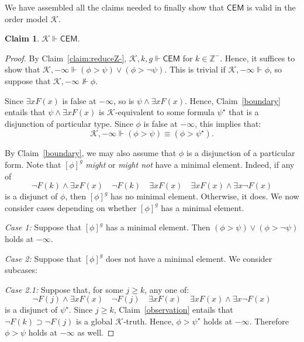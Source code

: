 \documentclass[12pt]{article}
\newtheorem{claim}{Claim}
\newcommand{\would}{\mathbin{>}}
\newcommand{\then}{\mathbin{\supset}}
\begin{document}
We have assembled all the claims needed to finally show that $\mathsf{CEM}$ is valid in the order model $\mathcal{K}$.

\begin{claim}\label{with-cem}
    $\mathcal{K} \Vdash \mathsf{CEM}$.
\end{claim}


\begin{proof}
    By Claim~\ref{claim:reduceZ-}, $\mathcal{K},k,g \Vdash \mathsf{CEM}$ for $k\in \mathbb{Z}^-$. 
    Hence, it suffices to show that $\mathcal{K},-\infty\Vdash (\phi \would \psi) \vee (\phi \would \neg \psi)$. 
    This is trivial if $\mathcal{K},-\infty \Vdash \phi$, so suppose that $\mathcal{K},-\infty \nVdash \phi$. 
    
    Since $\exists x F(x)$ is false at $-\infty$, so is $\psi\wedge \exists x F(x)$. 
    Hence, Claim~\ref{boundary} entails that $\psi\wedge \exists x F(x)$ is $\mathcal{K}$-equivalent to some formula $\psi^\star$ that is a disjunction of particular type. 
    Since $\phi$ is false at $-\infty$, this implies that: $$\mathcal{K},-\infty\Vdash (\phi \would \psi) \equiv (\phi \would \psi^\star).$$
    
    By Claim~\ref{boundary}, we may also assume that $\phi$ is a disjunction of a particular form. Note that $[\phi]^g$ \emph{might} or \emph{might not} have a minimal element. 
    Indeed, if any of
    $$\neg F(k) \wedge \exists x F(x) \quad  \neg F(k) \quad  \exists x F(x) \quad \exists x F(x) \wedge \exists x \neg F(x)$$ 
    is a disjunct of $\phi$, then $[\phi]^g$ has no minimal element. 
    Otherwise, it does. 
    We now consider cases depending on whether $[\phi]^g$ has a minimal element.
    
    \emph{Case 1:} Suppose that $[\phi]^g$ has a minimal element. 
    Then $(\phi \would \psi) \vee (\phi \would \neg\psi)$ holds at $-\infty$.
    
    \emph{Case 2:} Suppose that $[\phi]^g$ does not have a minimal element. We consider subcases:
    
    \emph{Case 2.1:} Suppose that, for some $j\geq k$, any one of:
    $$\neg F(j) \wedge \exists x F(x) \quad \neg F(j) \quad \exists x F(x) \quad \exists x F(x) \wedge \exists x \neg F(x)$$ 
    is a disjunct of $\psi^\star$. 
    Since $j\geq k$, Claim~\ref{observation} entails that $\neg F(k)\then \neg F(j)$ is a global $\mathcal{K}$-truth. 
    Hence, $\phi \would \psi^\star$ holds at $-\infty$. 
    Therefore $\phi \would \psi$ holds at $-\infty$ as well. 
    

\end{proof}
\end{document}
